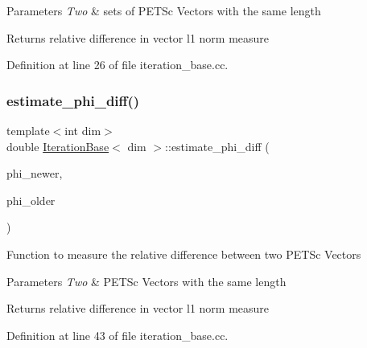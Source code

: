 \begin{DoxyParams}{Parameters}
{\em Two} & sets of P\+E\+T\+Sc Vectors with the same length \\
\hline
\end{DoxyParams}
\begin{DoxyReturn}{Returns}
relative difference in vector l1 norm measure 
\end{DoxyReturn}


Definition at line 26 of file iteration\+\_\+base.\+cc.

\mbox{\label{class_iteration_base_a5b823c5dda090e64bdba2abb815dfbf6}} 
\subsubsection{\texorpdfstring{estimate\+\_\+phi\+\_\+diff()}{estimate\_phi\_diff()}\hspace{0.1cm}{\footnotesize\ttfamily [2/4]}}
{\footnotesize\ttfamily template$<$int dim$>$ \\
double \hyperlink{class_iteration_base}{Iteration\+Base}$<$ dim $>$\+::estimate\+\_\+phi\+\_\+diff (\begin{DoxyParamCaption}\item[{P\+E\+T\+Sc\+Wrappers\+::\+M\+P\+I\+::\+Vector $\ast$}]{phi\+\_\+newer,  }\item[{P\+E\+T\+Sc\+Wrappers\+::\+M\+P\+I\+::\+Vector $\ast$}]{phi\+\_\+older }\end{DoxyParamCaption})\hspace{0.3cm}{\ttfamily [protected]}}

Function to measure the relative difference between two P\+E\+T\+Sc Vectors


\begin{DoxyParams}{Parameters}
{\em Two} & P\+E\+T\+Sc Vectors with the same length \\
\hline
\end{DoxyParams}
\begin{DoxyReturn}{Returns}
relative difference in vector l1 norm measure 
\end{DoxyReturn}


Definition at line 43 of file iteration\+\_\+base.\+cc.

\mbox{\label{class_iteration_base_aa929c0e69fd2566db98611b810354123}} 
